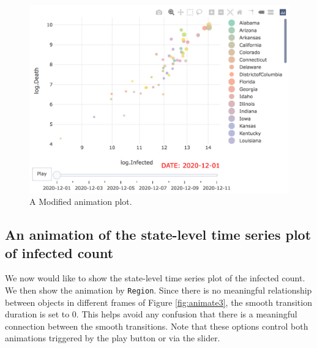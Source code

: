 \documentclass[]{book}
\begin{document}
\begin{figure}

{\centering \includegraphics[width=0.75\linewidth]{figures/animation2} 

}

\caption{A Modified animation plot.}\label{fig:animate2}
\end{figure}

\subsection{An animation of the state-level time series plot of infected
count}\label{an-animation-of-the-state-level-time-series-plot-of-infected-count}

We now would like to show the state-level time series plot of the
infected count. We then show the animation by \texttt{Region}. Since
there is no meaningful relationship between objects in different frames
of Figure \ref{fig:animate3}, the smooth transition duration is set to
0. This helps avoid any confusion that there is a meaningful connection
between the smooth transitions. Note that these options control both
animations triggered by the play button or via the slider.
\end{document}
